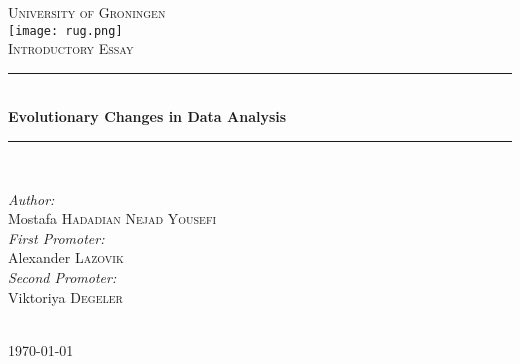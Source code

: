 \documentclass{article}
\begin{document}
\begin{titlepage}

\newcommand{\HRule}{\rule{\linewidth}{0.5mm}} %

\center %
 

\textsc{\LARGE University of Groningen}\\[1.5cm] %
\texttt{[image: rug.png]}\\[1cm] %
\textsc{\Large Introductory Essay}\\[0.5cm] %


\HRule \\[0.4cm]
{ \huge \bfseries Evolutionary Changes in Data Analysis}\\[0.4cm] %
\HRule \\[1.5cm]
 

\begin{minipage}{0.5\textwidth}
    \begin{center} \large
        \emph{Author:}\\
        Mostafa \textsc{Hadadian Nejad Yousefi}\\ %
        \bigskip \bigskip
        \emph{First Promoter:}\\
        Alexander \textsc{Lazovik}\\ %
        \bigskip \bigskip
        \emph{Second Promoter:}\\
        Viktoriya \textsc{Degeler}\\ %
    \end{center}
\end{minipage}\\[2cm]




{\large \today}\\[2cm] %

\vfill %

\end{titlepage}
\tableofcontents
\listoftables
\listoffigures


\clearpage

% 

% 
% 
% 
% 


\clearpage


\end{document}
